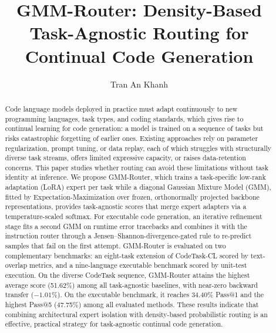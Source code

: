 \documentclass[a4paper,fleqn]{cas-dc}
\begin{document}
\let\WriteBookmarks\relax
\def\floatpagepagefraction{1}
\def\textpagefraction{.001}



\title[mode=title]{GMM-Router: Density-Based Task-Agnostic Routing for Continual Code Generation}

\author[1]{Tran An Khanh}
\cormark[1]



\begin{abstract}
Code language models deployed in practice must adapt continuously to new programming languages, task types, and coding standards, which gives rise to continual learning for code generation: a model is trained on a sequence of tasks but risks catastrophic forgetting of earlier ones. Existing approaches rely on parameter regularization, prompt tuning, or data replay, each of which struggles with structurally diverse task streams, offers limited expressive capacity, or raises data-retention concerns. This paper studies whether routing can avoid these limitations without task identity at inference. We propose GMM-Router, which trains a task-specific low-rank adaptation (LoRA) expert per task while a diagonal Gaussian Mixture Model (GMM), fitted by Expectation-Maximization over frozen, orthonormally projected backbone representations, provides task-agnostic scores that merge expert adapters via a temperature-scaled softmax. For executable code generation, an iterative refinement stage fits a second GMM on runtime error tracebacks and combines it with the instruction router through a Jensen--Shannon-divergence-gated rule to re-predict samples that fail on the first attempt. GMM-Router is evaluated on two complementary benchmarks: an eight-task extension of CodeTask-CL scored by text-overlap metrics, and a nine-language executable benchmark scored by unit-test execution. On the diverse CodeTask sequence, GMM-Router attains the highest average score (51.62\%) among all task-agnostic baselines, with near-zero backward transfer ($-1.01\%$). On the executable benchmark, it reaches 34.40\% Pass@1 and the highest Pass@5 (47.75\%) among all evaluated methods. These results indicate that combining architectural expert isolation with density-based probabilistic routing is an effective, practical strategy for task-agnostic continual code generation.
\end{abstract}
\end{document}
